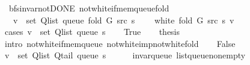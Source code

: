 \begin{isabellebody}
\endisatagproof
{\isafoldproof}%
%
\isadelimproof
\isanewline
%
\endisadelimproof
\isanewline
{}\isamarkupfalse%
\ {\isacharparenleft}{\kern0pt}\ bfs{\isacharunderscore}{\kern0pt}invar{\isacharunderscore}{\kern0pt}not{\isacharunderscore}{\kern0pt}DONE{\isacharparenright}{\kern0pt}\ not{\isacharunderscore}{\kern0pt}white{\isacharunderscore}{\kern0pt}if{\isacharunderscore}{\kern0pt}mem{\isacharunderscore}{\kern0pt}queue{\isacharunderscore}{\kern0pt}fold{\isacharcolon}{\kern0pt}\isanewline
\ \ \ {\isachardoublequoteopen}v\ {\isasymin}\ set\ {\isacharparenleft}{\kern0pt}Q{\isacharunderscore}{\kern0pt}list\ {\isacharparenleft}{\kern0pt}queue\ {\isacharparenleft}{\kern0pt}fold\ G\ src\ s{\isacharparenright}{\kern0pt}{\isacharparenright}{\kern0pt}{\isacharparenright}{\kern0pt}{\isachardoublequoteclose}\isanewline
\ \ \ {\isachardoublequoteopen}{\isasymnot}\ white\ {\isacharparenleft}{\kern0pt}fold\ G\ src\ s{\isacharparenright}{\kern0pt}\ v{\isachardoublequoteclose}\isanewline
%
\isadelimproof
%
\endisadelimproof
%
\isatagproof
{}\isamarkupfalse%
\ {\isacharparenleft}{\kern0pt}cases\ {\isachardoublequoteopen}v\ {\isasymin}\ set\ {\isacharparenleft}{\kern0pt}Q{\isacharunderscore}{\kern0pt}list\ {\isacharparenleft}{\kern0pt}queue\ s{\isacharparenright}{\kern0pt}{\isacharparenright}{\kern0pt}{\isachardoublequoteclose}{\isacharparenright}{\kern0pt}\isanewline
\ \ \isamarkupfalse%
\ True\isanewline
\ \ \isamarkupfalse%
\ {\isacharquery}{\kern0pt}thesis\isanewline
\ \ \ \ \isamarkupfalse%
\ {\isacharparenleft}{\kern0pt}intro\ not{\isacharunderscore}{\kern0pt}white{\isacharunderscore}{\kern0pt}if{\isacharunderscore}{\kern0pt}mem{\isacharunderscore}{\kern0pt}queue\ not{\isacharunderscore}{\kern0pt}white{\isacharunderscore}{\kern0pt}imp{\isacharunderscore}{\kern0pt}not{\isacharunderscore}{\kern0pt}white{\isacharunderscore}{\kern0pt}fold{\isacharparenright}{\kern0pt}\isanewline
{}\isamarkupfalse%
\isanewline
\ \ \isamarkupfalse%
\ False\isanewline
\ \ \isamarkupfalse%
\ {\isachardoublequoteopen}v\ {\isasymnotin}\ set\ {\isacharparenleft}{\kern0pt}Q{\isacharunderscore}{\kern0pt}list\ {\isacharparenleft}{\kern0pt}Q{\isacharunderscore}{\kern0pt}tail\ {\isacharparenleft}{\kern0pt}queue\ s{\isacharparenright}{\kern0pt}{\isacharparenright}{\kern0pt}{\isacharparenright}{\kern0pt}{\isachardoublequoteclose}\isanewline
\ \ \ \ \isamarkupfalse%
\ invar{\isacharunderscore}{\kern0pt}queue\ list{\isacharunderscore}{\kern0pt}queue{\isacharunderscore}{\kern0pt}non{\isacharunderscore}{\kern0pt}empty\isanewline

\end{isabellebody}
